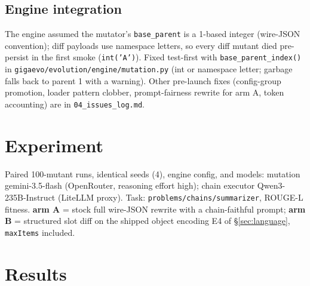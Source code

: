 \documentclass[11pt]{article}
\newcommand{\armA}{\textcolor{bad}{arm A}}
\newcommand{\armB}{\textcolor{accent}{arm B}}
\begin{document}
\subsection{Engine integration}
The engine assumed the mutator's \texttt{base\_parent} is a 1-based integer (wire-JSON
convention); diff payloads use namespace letters, so every diff mutant died pre-persist in
the first smoke (\texttt{int('A')}). Fixed test-first with \texttt{base\_parent\_index()} in
\texttt{gigaevo/evolution/engine/mutation.py} (int or namespace letter; garbage falls back to
parent 1 with a warning). Other pre-launch fixes (config-group promotion, loader pattern
clobber, prompt-fairness rewrite for arm A, token accounting) are in
\texttt{04\_issues\_log.md}.

\section{Experiment}
\label{sec:experiment}
Paired 100-mutant runs, identical seeds (4), engine config, and models: mutation
gemini-3.5-flash (OpenRouter, reasoning effort high); chain executor Qwen3-235B-Instruct
(LiteLLM proxy). Task: \texttt{problems/chains/summarizer}, ROUGE-L fitness.
\textbf{\armA{}} = stock full wire-JSON rewrite with a chain-faithful prompt;
\textbf{\armB{}} = structured slot diff on the shipped object encoding E4 of
\S\ref{sec:language}, \texttt{maxItems} included.

\section{Results}
\end{document}
